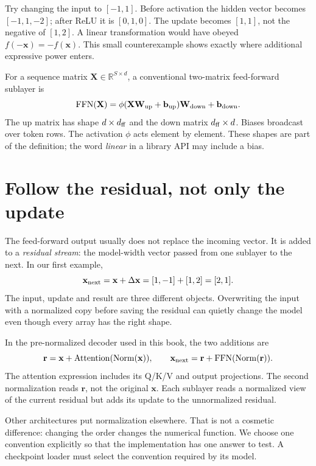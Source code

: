 Try changing the input to $[-1,1]$. Before activation the hidden vector
becomes $[-1,1,-2]$; after ReLU it is $[0,1,0]$. The update becomes
$[1,1]$, not the negative of $[1,2]$. A linear transformation would have
obeyed $f(-\mathbf x)=-f(\mathbf x)$. This small counterexample shows
exactly where additional expressive power enters.

For a sequence matrix $\mathbf X\in\mathbb R^{S\times d}$, a conventional
two-matrix feed-forward sublayer is
\[
 \operatorname{FFN}(\mathbf X)=
 \phi(\mathbf X\mathbf W_{\rm up}+\mathbf b_{\rm up})
 \mathbf W_{\rm down}+\mathbf b_{\rm down}.
\]
The up matrix has shape $d\times d_{\rm ff}$ and the down matrix
$d_{\rm ff}\times d$. Biases broadcast over token rows. The activation
$\phi$ acts element by element. These shapes are part of the definition;
the word \emph{linear} in a library API may include a bias.

\section{Follow the residual, not only the update}
The feed-forward output usually does not replace the incoming vector.
It is added to a \emph{residual stream}: the model-width vector passed
from one sublayer to the next. In our first example,
\[
 \mathbf x_{\rm next}=\mathbf x+\Delta\mathbf x
                    =[1,-1]+[1,2]=[2,1].
\]
The input, update and result are three different objects. Overwriting the
input with a normalized copy before saving the residual can quietly change
the model even though every array has the right shape.

In the pre-normalized decoder used in this book, the two additions are
\[
 \mathbf r=\mathbf x+
   \operatorname{Attention}(\operatorname{Norm}(\mathbf x)),\qquad
 \mathbf x_{\rm next}=\mathbf r+
   \operatorname{FFN}(\operatorname{Norm}(\mathbf r)).
\]
The attention expression includes its Q/K/V and output projections.
The second normalization reads $\mathbf r$, not the original $\mathbf x$.
Each sublayer reads a normalized view of the current residual but adds
its update to the unnormalized residual.

Other architectures put normalization elsewhere. That is not a cosmetic
difference: changing the order changes the numerical function. We choose
one convention explicitly so that the implementation has one answer to
test. A checkpoint loader must select the convention required by its model.


